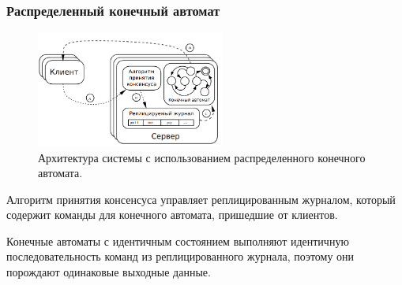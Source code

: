 \documentclass[pdf, 10pt, unicode,aspectratio=169]{beamer} %
\begin{document}
\begin{frame}
\frametitle{Распределенный конечный автомат}


\vspace{-15pt}

\begin{figure}
\vspace{-25pt}
\hspace{-20pt}
\includegraphics[width=0.55\textwidth]{state_machine.png}
\caption{Архитектура системы с использованием распределенного конечного автомата.}
\end{figure}


 Алгоритм принятия консенсуса управляет реплицированным журналом, который содержит команды для конечного автомата, пришедшие от клиентов. 

Конечные автоматы с идентичным состоянием выполняют идентичную последовательность команд из реплицированного журнала, поэтому они порождают одинаковые выходные данные.

\end{frame}
\end{document}
